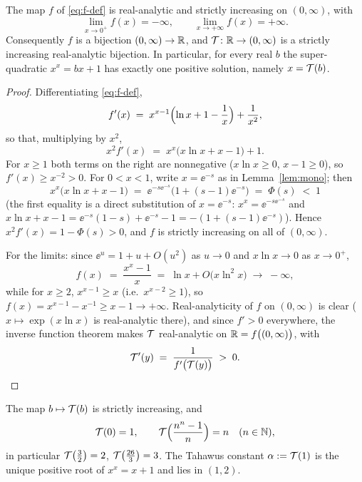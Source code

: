 \begin{theorem}\label{thm:bijection}
The map $f$ of \eqref{eq:f-def} is real-analytic and strictly
increasing on $(0,\infty)$, with
\[
    \lim_{x \to 0^{+}} f(x) = -\infty,
    \qquad
    \lim_{x \to +\infty} f(x) = +\infty .
\]
Consequently $f$ is a bijection $(0,\infty) \to \mathbb{R}$, and $\mathcal{T} \colon
\mathbb{R} \to (0,\infty)$ is a strictly increasing real-analytic bijection.
In particular, for every real $b$ the super-quadratic
$x^{x} = bx + 1$ has exactly one positive solution, namely
$x = \mathcal{T}(b)$.
\end{theorem}

\begin{proof}
Differentiating \eqref{eq:f-def},
\begin{equation}\label{eq:fprime}
    f'(x) \;=\; x^{x-1}\Bigl(\ln x + 1 - \frac{1}{x}\Bigr) + \frac{1}{x^{2}} ,
\end{equation}
so that, multiplying by $x^{2}$,
\begin{equation}\label{eq:x2fprime}
    x^{2} f'(x) \;=\; x^{x}\bigl(x \ln x + x - 1\bigr) + 1 .
\end{equation}
For $x \ge 1$ both terms on the right are nonnegative ($x\ln x \ge 0$,
$x - 1 \ge 0$), so $f'(x) \ge x^{-2} > 0$. For $0 < x < 1$, write
$x = \ee^{-s}$ as in Lemma~\ref{lem:mono}; then
\[
    x^{x}\bigl(x\ln x + x - 1\bigr)
    \;=\; \ee^{-s\ee^{-s}}\bigl(1 + (s-1)\ee^{-s}\bigr)
    \;=\; \Phi(s) \;<\; 1
\]
(the first equality is a direct substitution of $x = \ee^{-s}$:
$x^{x} = \ee^{-s\ee^{-s}}$ and $x\ln x + x - 1 = \ee^{-s}(1 - s) + 
\ee^{-s} - 1 = -(1 + (s-1)\ee^{-s})$). Hence $x^{2}f'(x) = 1 - \Phi(s)
> 0$, and $f$ is strictly increasing on all of $(0,\infty)$.

For the limits: since $\ee^{u} = 1 + u + O(u^{2})$ as $u \to 0$ and
$x \ln x \to 0$ as $x \to 0^{+}$,
\[
    f(x) \;=\; \frac{x^{x} - 1}{x} \;=\; \ln x + O\bigl(x \ln^{2} x\bigr)
    \;\longrightarrow\; -\infty ,
\]
while for $x \ge 2$, $x^{x-1} \ge x$ (i.e.\ $x^{x-2} \ge 1$), so
$f(x) = x^{x-1} - x^{-1} \ge x - 1 \to +\infty$. Real-analyticity of
$f$ on $(0,\infty)$ is clear ($x \mapsto \exp(x\ln x)$ is
real-analytic there), and since $f' > 0$ everywhere, the inverse
function theorem makes $\mathcal{T}$ real-analytic on $\mathbb{R} = f\bigl((0,\infty)\bigr)$,
with
\[
    \mathcal{T}'(y) \;=\; \frac{1}{f'\bigl(\mathcal{T}(y)\bigr)} \;>\; 0 .
    \qedhere
\]
\end{proof}

\begin{corollary}
\label{cor:values}
The map $b \mapsto \mathcal{T}(b)$ is strictly increasing, and
\[
    \mathcal{T}(0) = 1, \qquad
    \mathcal{T}\Bigl(\frac{n^{n}-1}{n}\Bigr) = n \quad (n \in \mathbb{N}),
\]
in particular $\mathcal{T}\bigl(\tfrac{3}{2}\bigr) = 2$,
$\mathcal{T}\bigl(\tfrac{26}{3}\bigr) = 3$. The Tahawus constant
$\alpha := \mathcal{T}(1)$ is the unique positive root of $x^{x} = x + 1$ and
lies in $(1,2)$.
\end{corollary}

